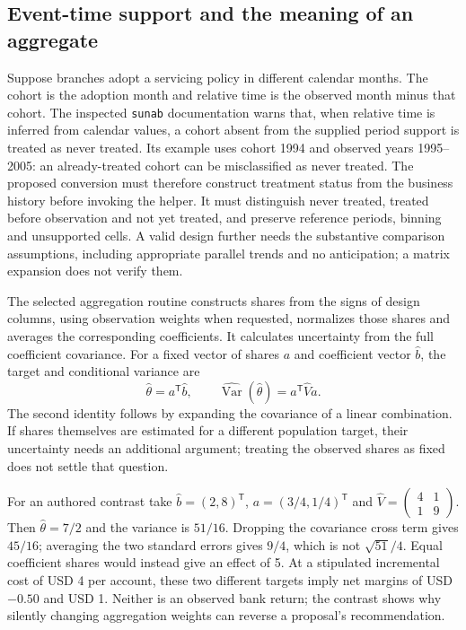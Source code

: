 \subsection{Event-time support and the meaning of an aggregate}
\label{exec20:fx-eventtime}
Suppose branches adopt a servicing policy in different calendar months.
The cohort is the adoption month and relative time is the observed month
minus that cohort. The inspected \texttt{sunab} documentation warns that,
when relative time is inferred from calendar values, a cohort absent from
the supplied period support is treated as never treated. Its example uses
cohort 1994 and observed years 1995--2005: an already-treated cohort can be
misclassified as never treated. The proposed conversion must therefore
construct treatment status from the business history before invoking the
helper. It must distinguish never treated, treated before observation and
not yet treated, and preserve reference periods, binning and unsupported
cells. A valid design further needs the substantive comparison assumptions,
including appropriate parallel trends and no anticipation; a matrix expansion
does not verify them.~\citep{exec20_fixest_source}

The selected aggregation routine constructs shares from the signs of design
columns, using observation weights when requested, normalizes those shares
and averages the corresponding coefficients. It calculates uncertainty from
the full coefficient covariance. For a fixed vector of shares $a$ and
coefficient vector $\widehat b$, the target and conditional variance are
\begin{equation}
 \widehat\theta=a^{\mathsf T}\widehat b,\qquad
 \widehat{\operatorname{Var}}(\widehat\theta)=a^{\mathsf T}\widehat V a.
 \label{exec20:fx-aggregate}
\end{equation}
The second identity follows by expanding the covariance of a linear
combination. If shares themselves are estimated for a different population
target, their uncertainty needs an additional argument; treating the observed
shares as fixed does not settle that question.~\citep{exec20_fixest_source}

For an authored contrast take $\widehat b=(2,8)^{\mathsf T}$,
$a=(3/4,1/4)^{\mathsf T}$ and
$\widehat V=\left(\begin{smallmatrix}4&1\\1&9\end{smallmatrix}\right)$.
Then $\widehat\theta=7/2$ and the variance is $51/16$. Dropping the covariance
cross term gives $45/16$; averaging the two standard errors gives $9/4$,
which is not $\sqrt{51}/4$. Equal coefficient shares would instead give an
effect of 5. At a stipulated incremental cost of USD 4 per account, these two
different targets imply net margins of USD $-0.50$ and USD 1. Neither is an
observed bank return; the contrast shows why silently changing aggregation
weights can reverse a proposal's recommendation.~\citep{exec20_fixest_reference}

